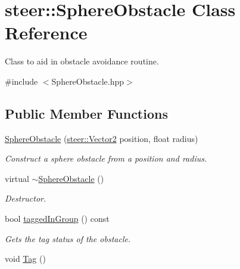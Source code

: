 \hypertarget{classsteer_1_1_sphere_obstacle}{\section{steer\-:\-:Sphere\-Obstacle Class Reference}
\label{classsteer_1_1_sphere_obstacle}
}


Class to aid in obstacle avoidance routine.  




{\ttfamily \#include $<$Sphere\-Obstacle.\-hpp$>$}

\subsection*{Public Member Functions}
\begin{DoxyCompactItemize}
\item 
\hyperlink{classsteer_1_1_sphere_obstacle_a7afc66c47d05366c1df420f54281fc5d}{Sphere\-Obstacle} (\hyperlink{structsteer_1_1_vector2}{steer\-::\-Vector2} position, float radius)
\begin{DoxyCompactList}\small\item\em Construct a sphere obstacle from a position and radius. \end{DoxyCompactList}\item 
\hypertarget{classsteer_1_1_sphere_obstacle_a5ca5b6c0047ffb7ded454c517656c688}{virtual \hyperlink{classsteer_1_1_sphere_obstacle_a5ca5b6c0047ffb7ded454c517656c688}{$\sim$\-Sphere\-Obstacle} ()}\label{classsteer_1_1_sphere_obstacle_a5ca5b6c0047ffb7ded454c517656c688}

\begin{DoxyCompactList}\small\item\em Destructor. \end{DoxyCompactList}\item 
\hypertarget{classsteer_1_1_sphere_obstacle_a707db36f3d4be339ac84b541144b9e6f}{bool \hyperlink{classsteer_1_1_sphere_obstacle_a707db36f3d4be339ac84b541144b9e6f}{tagged\-In\-Group} () const }\label{classsteer_1_1_sphere_obstacle_a707db36f3d4be339ac84b541144b9e6f}

\begin{DoxyCompactList}\small\item\em Gets the tag status of the obstacle. \end{DoxyCompactList}\item 
\hypertarget{classsteer_1_1_sphere_obstacle_a85edbab5d36268565f65bbe55a72ac9e}{void \hyperlink{classsteer_1_1_sphere_obstacle_a85edbab5d36268565f65bbe55a72ac9e}{Tag} ()}\label{classsteer_1_1_sphere_obstacle_a85edbab5d36268565f65bbe55a72ac9e}


\end{DoxyCompactItemize}
